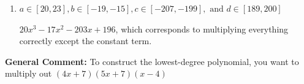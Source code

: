 \documentclass{extbook}[14pt]
\begin{document}
\begin{enumerate}
{\begin{enumerate}[label=\Alph*.]
$20x^{3} -87 x^{2} -21 x + 196$, which corresponds to multiplying out $(4x -7)(5x + 7)(x -4)$.
\item \( a \in [20, 23], b \in [-19, -15], c \in [-207, -199], \text{ and } d \in [189, 200] \)

$20x^{3} -17 x^{2} -203 x + 196$, which corresponds to multiplying everything correctly except the constant term.
\end{enumerate}

\textbf{General Comment:} To construct the lowest-degree polynomial, you want to multiply out $(4x + 7)(5x + 7)(x -4)$
}
\end{enumerate}
\end{document}
